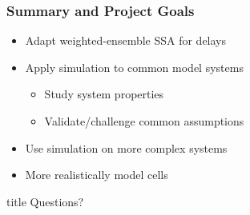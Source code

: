\documentclass[xcolor={usenames,dvipsnames,svgnames}]{beamer}
\begin{document}
\begin{frame}
    \frametitle{Summary and Project Goals}
    \begin{itemize}
        \item Adapt weighted-ensemble SSA for delays
        \item Apply simulation to common model systems
        \begin{itemize}
            \item Study system properties
            \item Validate/challenge common assumptions
        \end{itemize}
        \item Use simulation on more complex systems
        \item More realistically model cells
    \end{itemize}
\end{frame}

\begin{frame}[plain]

\hfill
    \begin{beamercolorbox}[rounded=true, center, shadow=true,wd=6cm]{title}
        \huge Questions?
    \end{beamercolorbox}
\hfill\hfill

\end{frame}
\end{document}

